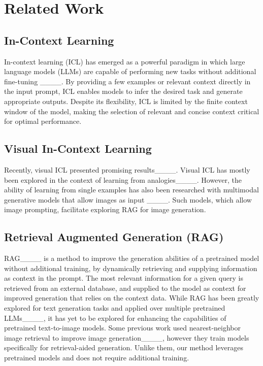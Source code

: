\section{Related Work}
\label{sec:prior_work}

\subsection{In-Context Learning}

In-context learning (ICL) has emerged as a powerful paradigm in which large language models (LLMs) are capable of performing new tasks without additional fine-tuning ____. By providing a few examples or relevant context directly in the input prompt, ICL enables models to infer the desired task and generate appropriate outputs.
Despite its flexibility, ICL is limited by the finite context window of the model, making the selection of relevant and concise context critical for optimal performance.

\vspace{-6pt}
\subsection{Visual In-Context Learning}\vspace{-2pt}

Recently, visual ICL presented promising results____.
Visual ICL has mostly been explored in the context of learning from analogies____.
However, the ability of learning from single examples has also been researched with multimodal generative models that allow images as input ____. 
Such models, which allow image prompting, facilitate exploring RAG for image generation.

\vspace{-4pt}
\subsection{Retrieval Augmented Generation (RAG)}
RAG____ is a method to improve the generation abilities of a pretrained model without additional training, by dynamically retrieving and supplying information as context in the prompt. 
The most relevant information for a given query is retrieved from an external database, and supplied to the model as context for improved generation that relies on the context data.
While RAG has been greatly explored for text generation tasks and applied over multiple pretrained LLMs____, it has yet to be explored for enhancing the capabilities of pretrained text-to-image models.
Some previous work used nearest-neighbor image retrieval to improve image generation____, however they train models specifically for retrieval-aided generation. Unlike them, our method leverages pretrained models and does not require additional training.

